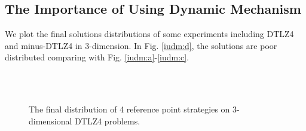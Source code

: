 \documentclass[conference]{IEEEtran}
\begin{document}
% 
\subsection{The Importance of Using Dynamic Mechanism}
We plot the final solutions distributions of some experiments including DTLZ4 and minus-DTLZ4 in 3-dimension.
In Fig. \ref{iudm:d}, the solutions are poor distributed comparing with Fig. \ref{iudm:a}-\ref{iudm:c}.
\begin{figure}[!t]
  \centering
  \quad
  \\
  \quad
  \\
  \caption{
    The final distribution of 4 reference point strategies on 3-dimensional DTLZ4 problems.
  }
  \label{iudm1}
\end{figure} 
\end{document}
